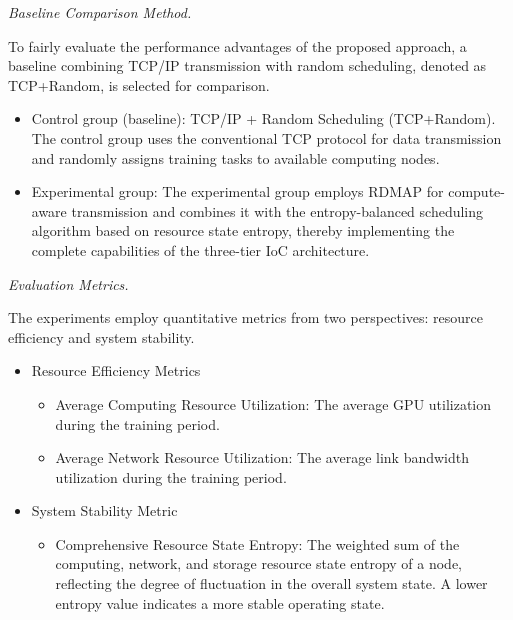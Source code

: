 \documentclass{ccjnl}
\begin{document}
\nopagebreak[4]
\par
{}
\noindent\textit{Baseline Comparison Method.}\par

To fairly evaluate the performance advantages of the proposed approach, a baseline combining TCP/IP transmission with random scheduling, denoted as TCP+\allowbreak Random, is selected for comparison.

\begin{itemize}[nosep]
	\item Control group (baseline): 
	TCP/IP + Random Scheduling (TCP+\allowbreak Random).
	The control group uses the conventional TCP protocol for data transmission and randomly assigns training tasks to available computing nodes.
	
	\item Experimental group:
	The experimental group employs RDMAP for compute-aware transmission and combines it with the entropy-balanced scheduling algorithm based on resource state entropy, thereby implementing the complete capabilities of the three-tier IoC architecture.
\end{itemize}

\par
{}
\noindent\textit{Evaluation Metrics.}\par

The experiments employ quantitative metrics from two perspectives: resource efficiency and system stability.

\begin{itemize}[nosep]
	\renewcommand{\labelenumi}{\arabic{enumi})}
	
	\item Resource Efficiency Metrics
	
	\begin{itemize}[nosep]
		\item Average Computing Resource Utilization:
		The average GPU utilization during the training period.
		
		\item Average Network Resource Utilization:
		The average link bandwidth utilization during the training period.
	\end{itemize}
	
	\item System Stability Metric
	
	\begin{itemize}[nosep]
		\item Comprehensive Resource State Entropy:
		The weighted sum of the computing, network, and storage resource state entropy of a node, reflecting the degree of fluctuation in the overall system state. A lower entropy value indicates a more stable operating state.
	\end{itemize}
\end{itemize}
\end{document}
